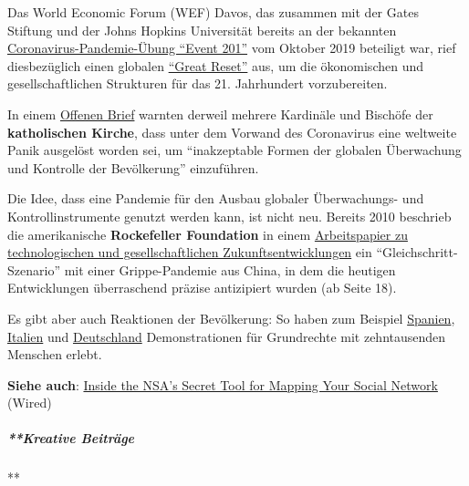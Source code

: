 Das World Economic Forum (WEF) Davos, das zusammen mit der Gates
Stiftung und der Johns Hopkins Universität bereits an der bekannten
\href{https://www.centerforhealthsecurity.org/event201/scenario.html}{Coronavirus-Pandemie-Übung
``Event 201''} vom Oktober 2019 beteiligt war, rief diesbezüglich einen
globalen \href{https://www.youtube.com/watch?v=u5pxhSnDr4U}{``Great
Reset''} aus, um die ökonomischen und gesellschaftlichen Strukturen für
das 21. Jahrhundert vorzubereiten.

In einem \href{https://veritasliberabitvos.info/appeal/}{Offenen Brief}
warnten derweil mehrere Kardinäle und Bischöfe der \textbf{katholischen
Kirche}, dass unter dem Vorwand des Coronavirus eine weltweite Panik
ausgelöst worden sei, um ``inakzeptable Formen der globalen Überwachung
und Kontrolle der Bevölkerung'' einzuführen.

Die Idee, dass eine Pandemie für den Ausbau globaler Überwachungs- und
Kontroll­instrumente genutzt werden kann, ist nicht neu. Bereits 2010
beschrieb die amerikanische \textbf{Rockefeller Foundation} in einem
\href{https://swprs.files.wordpress.com/2020/04/rockefeller-foundation-scenarios-2010.pdf}{Arbeitspapier
zu technologischen und gesellschaftlichen Zukunfts­entwicklungen} ein
``Gleichschritt-Szenario'' mit einer Grippe-Pandemie aus China, in dem
die heutigen Entwicklungen überraschend präzise antizipiert wurden (ab
Seite 18).

Es gibt aber auch Reaktionen der Bevölkerung: So haben zum Beispiel
\href{https://www.youtube.com/watch?v=BZo3BYD2qpI}{Spanien},
\href{https://www.youtube.com/watch?v=P2Tcs8RzK1k}{Italien} und
\href{https://www.youtube.com/watch?v=Iqm456JIaBQ}{Deutschland}
Demonstrationen für Grundrechte mit zehntausenden Menschen erlebt.

\textbf{Siehe auch}:
\href{https://www.wired.com/story/inside-the-nsas-secret-tool-for-mapping-your-social-network/}{Inside
the NSA's Secret Tool for Mapping Your Social Network} (Wired)

\hypertarget{kreative-beitruxe4ge}{%
\subparagraph{**Kreative Beiträge}\label{kreative-beitruxe4ge}}

**

